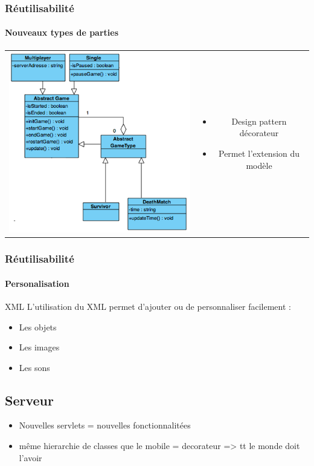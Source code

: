 	\begin{frame}
	\frametitle{Réutilisabilité}
	\framesubtitle{Nouveaux types de parties}

	
	\begin{tabular}{cc}
	\begin{minipage}{5cm}
		\includegraphics[scale=0.4]{img/decorateur.png} 
	\end{minipage}
	&
	\begin{minipage}{5cm}
	\begin{itemize} 
		\item Design pattern décorateur
		\item Permet l'extension du modèle
	\end{itemize} 
	\end{minipage}
	\end{tabular}
	
	\end{frame}
	

	\begin{frame}
	\frametitle{Réutilisabilité}
	\framesubtitle{Personalisation}
	
		XML
			L'utilisation du XML permet d'ajouter ou de personnaliser facilement :
			\begin{itemize}
				\item Les objets
				\item Les images
				\item Les sons
			\end{itemize}
	\end{frame}
	

\subsection{Serveur}

		\begin{itemize}
			\item Nouvelles servlets = nouvelles fonctionnalitées
			\item même hierarchie de classes que le mobile = decorateur => tt le monde doit l'avoir 
		\end{itemize}